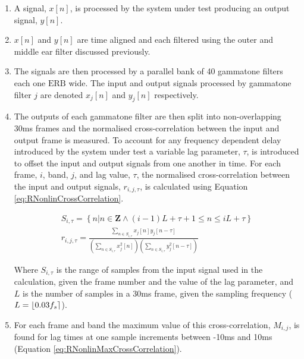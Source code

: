 			\begin{enumerate}
				\item A signal, $x[n]$, is processed by the system under test producing an output signal,
					$y[n]$.

				\item $x[n]$ and $y[n]$ are time aligned and each filtered using the outer and middle ear
					filter discussed previously.

				\item The signals are then processed by a parallel bank of 40 gammatone filters each one
					$\mathrm{ERB}$ wide. The input and output signals processed by gammatone filter $j$
					are denoted $x_j[n]$ and $y_j[n]$ respectively.

				\item The outputs of each gammatone filter are then split into non-overlapping 30ms frames
					and the normalised cross-correlation between the input and output frame is measured.
					To account for any frequency dependent delay introduced by the system under test a
					variable lag parameter, $\tau$, is introduced to offset the input and output signals
					from one another in time. For each frame, $i$, band, $j$, and lag value, $\tau$, the
					normalised cross-correlation between the input and output signals, $r_{i,j,\tau}$,
					is calculated using Equation \ref{eq:RNonlinCrossCorrelation}.

					\begin{gather}
						S_{i,\tau} = \left\{ n | n \in \textbf{Z} 
							     \land (i-1)L+\tau+1 \leq n \leq iL + \tau \right\} \nonumber \\
						r_{i,j,\tau} = \frac{\sum_{n \in S_{i,\tau}} x_{j}[n]y_{j}[n-\tau]}
							{\left( \sum_{n \in S_{i,\tau}} x_{j}^{2}[n] \right) 
							\left( \sum_{n \in S_{i,\tau}} y_{j}^{2}[n-\tau] \right)}
						\label{eq:RNonlinCrossCorrelation}
					\end{gather}

					Where $S_{i,\tau}$ is the range of samples from the input signal used in the
					calculation, given the frame number and the value of the lag parameter, and $L$ is
					the number of samples in a 30ms frame, given the sampling frequency ($L =
					\left\lfloor0.03f_{s}\right\rceil$). 

				\item For each frame and band the maximum value of this cross-correlation, $M_{i,j}$, is
					found for lag times at one sample increments between -10ms and 10ms (Equation
					\ref{eq:RNonlinMaxCrossCorrelation}).


\end{enumerate}
